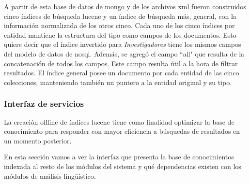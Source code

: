 A partir de esta base de datos de mongo y de los archivos xml fueron construidos cinco índices
de búsqueda lucene y un índice de búsqueda más, general, con la
información normalizada de los otros cinco. 
Cada uno de los cinco índices por entidad mantiene la estructura del tipo como campos de los documentos.
Esto quiere decir que el índice invertido para \emph{Investigadores} tiene los mismos campos
del modelo de datos de nosql. Además, se agregó el campo ``all" que resulta de la concatenación de
todos los campos. Este campo resulta útil a la hora de filtrar resultados. 
El índice general posee un documento por cada entidad de las cinco colecciones, 
manteniendo también un puntero a la entidad original y su tipo.




\subsubsection{Interfaz de servicios}
\label{subsec:modelos-db}
La creación offline de índices lucene tiene como finalidad optimizar
la base de conocimiento para responder con mayor eficiencia 
a búsquedas de resultados en un momento posterior. 

En esta sección vamos a ver la interfaz que presenta la base de conocimientos indexada 
al resto de los módulos del sistema y qué dependencias existen con los módulos de
análisis lingüístico.

